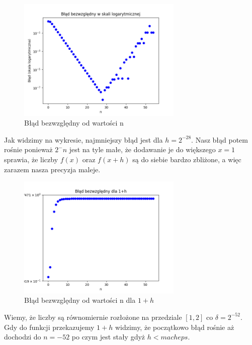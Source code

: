 \documentclass{article}
\begin{document}
\begin{figure}[H]
  \centering
  \includegraphics[width=0.7\textwidth]{../fig.png} %
  \caption{Błąd bezwzględny od wartości n}
  \label{fig:fig1}
\end{figure}

Jak widzimy na wykresie, najmniejszy błąd jest dla $h = 2^{-28}$.
Nasz błąd potem rośnie ponieważ $2^-n$ jest na tyle małe, że dodawanie je do większego $x = 1$ sprawia, że
liczby $f(x)$ oraz $f(x + h)$ są do siebie bardzo zbliżone, a więc zarazem
nasza precyzja maleje.

\begin{figure}[H]
  \centering
  \includegraphics[width=0.7\textwidth]{../fig2.png} %
  \caption{Błąd bezwzględny od wartości n dla $1+h$}
  \label{fig:your_label}
\end{figure}

Wiemy, że liczby są równomiernie rozłożone na przedziale $[1,2]$ co
$\delta = 2^{-52}$. Gdy do funkcji przekazujemy $1 + h$ widzimy, że
początkowo błąd rośnie aż dochodzi do $n = -52$ po czym jest stały gdyż
$h < macheps$.
\end{document}
